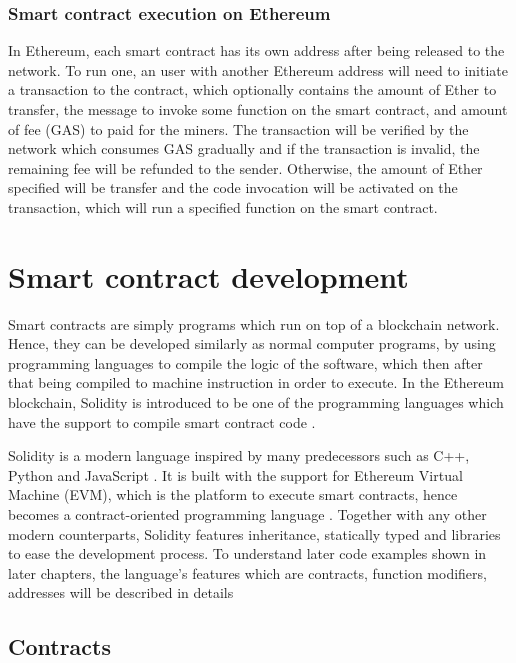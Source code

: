 \documentclass[twoside,draftfooter]{tutthesis} %
\begin{document}
\subsection{Smart contract execution on Ethereum}

In Ethereum, each smart contract has its own address after being released to the network. To run one, an user with another Ethereum address will need to initiate a transaction to the contract, which optionally contains the amount of Ether to transfer, the message to invoke some function on the smart contract, and amount of fee (GAS) to paid for the miners. The transaction will be verified by the network which consumes GAS gradually and if the transaction is invalid, the remaining fee will be refunded to the sender. Otherwise, the amount of Ether specified will be transfer and the code invocation will be activated on the transaction, which will run a specified function on the smart contract.

\chapter{Smart contract development}
\label{ch:smartcontractdev}

Smart contracts are simply programs which run on top of a blockchain network. Hence, they can be developed similarly as normal computer programs, by using programming languages to compile the logic of the software, which then after that being compiled to machine instruction in order to execute. In the Ethereum blockchain, Solidity is introduced to be one of the programming languages which have the support to compile smart contract code \citep{SolidityDocumentation}. 

Solidity is a modern language inspired by many predecessors such as C++, Python and JavaScript \citep{SolidityDocumentation}. It is built with the support for Ethereum Virtual Machine (EVM), which is the platform to execute smart contracts, hence becomes a contract-oriented programming language \citep{SolidityDocumentation}. Together with any other modern counterparts, Solidity features inheritance, statically typed and libraries to ease the development process. To understand later code examples shown in later chapters, the language's features which are contracts, function modifiers, addresses will be described in details

\section{Contracts}
\end{document}
